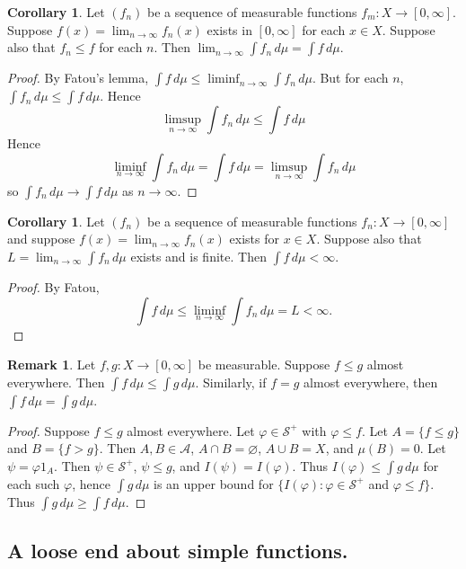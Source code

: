 \documentclass{article}
\theoremstyle{definition}
\newtheorem{corollary}[theorem]{Corollary}
\newtheorem*{remark}{Remark}
\begin{document}
\begin{corollary}
    Let $(f_n)$ be a sequence of measurable functions $f_m : X \longrightarrow [0, \infty]$. Suppose $f(x) = \lim_{n\to\infty} f_n(x)$ exists in $[0, \infty]$ for each $x \in X$. Suppose also that $f_n \leq f$ for each $n$. Then $\lim_{n\to\infty} \int f_n\,d\mu = \int f\,d\mu$.
\end{corollary}
\begin{proof}
    By Fatou's lemma, $\int f\,d\mu \leq \liminf_{n\to\infty} \int f_n\,d\mu$. But for each $n$, $\int f_n\,d\mu \leq \int f\,d\mu$. Hence \[\limsup_{n\to\infty} \int f_n\,d\mu \leq \int f\,d\mu\] Hence
    \[
        \liminf_{n\to\infty} \int f_n\,d\mu = \int f\,d\mu = \limsup_{n\to\infty} \int f_n\,d\mu
    \]
    so $\int f_n\,d\mu \to \int f\,d\mu$ as $n\to \infty$.
\end{proof}
\begin{corollary}
    Let $(f_n)$ be a sequence of measurable functions $f_n : X \longrightarrow [0, \infty]$ and suppose $f(x) = \lim_{n\to\infty} f_n(x)$ exists for $x \in X$.
    Suppose also that $L = \lim_{n\to\infty} \int f_n\,d\mu$ exists and is finite. Then $\int f\,d\mu < \infty$.
\end{corollary}
\begin{proof}
    By Fatou, \[\int f\,d\mu \leq \liminf_{n\to\infty} \int f_n\,d\mu = L < \infty.\]
\end{proof}

\begin{remark}
Let $f, g : X \longrightarrow [0, \infty]$ be measurable. Suppose $f \leq g$ almost everywhere. Then $\int f\,d\mu \leq \int g\,d\mu$. Similarly, if $f = g$ almost everywhere, then $\int f\,d\mu = \int g\,d\mu$.
\end{remark}
\begin{proof}
    Suppose $f \leq g$ almost everywhere. Let $\varphi \in \mathscr{S}^+$ with $\varphi \leq f$. Let $A = \{f \leq g\}$ and $B = \{f > g\}$. Then $A, B \in \mathscr{A}$, $A \cap B = \varnothing$, $A \cup B = X$, and $\mu(B) = 0$. Let $\psi = \varphi 1_A$. Then $\psi \in \mathscr{S}^+$, $\psi \leq g$, and $I(\psi) = I(\varphi)$. Thus $I(\varphi) \leq \int g\,d\mu$ for each such $\varphi$, hence $\int g\,d\mu$ is an upper bound for $\{I(\varphi) : \varphi \in \mathscr{S}^+$ and $\varphi \leq f\}$. Thus $\int g\,d\mu \geq \int f\,d\mu$.
\end{proof}

\subsection*{A loose end about simple functions.}
\end{document}
